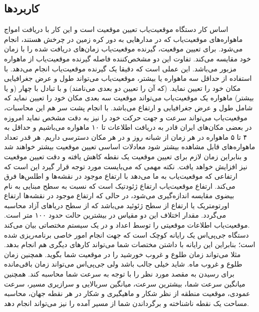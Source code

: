 \subsection{کاربردها}
اساس کار دستگاه موقعیت‌یاب تعیین موقعیت است و این کار با دریافت امواج ماهواره‌های موقعیت‌یاب که در مدارهایی به دور کره زمین در چرخش هستند، انجام می‌شود. برای تعیین موقعیت، گیرنده موقعیت‌یاب زمان‌های دریافت شده را با زمان خود مقایسه می‌کند. تفاوت این دو مشخص‌کننده فاصله گیرنده موقعیت‌یاب از ماهواره مزبور می‌باشد. این عملی است که دقیقا یک گیرنده موقعیت‌یاب انجام می‌دهد. با استفاده از حداقل سه ماهواره یا بیشتر، موقعیت‌یاب می‌تواند طول و عرض جغرافیایی مکان خود را تعیین نماید. (که آن را تعیین دو بعدی می‌نامند) و با تبادل با چهار (و یا بیشتر) ماهواره یک موقعیت‌یاب می‌تواند موقعیت سه بعدی مکان خود را تعیین نماید که شامل طول و عرض جغرافیایی و ارتفاع می‌باشد. با انجام پشت سر هم این محاسبات، موقعیت‌یاب می‌تواند سرعت و جهت حرکت خود را نیز به دقت مشخص نماید امروزه در بعضی مکان‌های ایران قادر به دریافت اطلاعات تا ۱۰ ماهواره می‌باشیم و حداقل به ۴ تا ۵ ماهواره در هر زمان از شبانه روز و در هر مکان دسترسی داریم. هر قدر تعداد ماهواره‌های قابل مشاهده بیشتر شود معادلات اساسی تعیین موقعیت بیشتر خواهند شد و بنابراین زمان لازم برای تعیین موقعیت یک نقطه کاهش یافته و دقت تعیین موقعیت نیز افزایش خواهد یافت. نکته مهمی که می‌بایست مورد توجه قرار گیرد این است که ارتفاعی که موقعیت‌یاب به ما می‌دهد با ارتفاع موجود در نقشه‌ها و اطلس‌ها فرق می‌کند. ارتفاع موقعیت‌یاب ارتفاع ژئودتیک است که نسبت به سطح مبنایی به نام بیضوی مقایسه اندازه‌گیری می‌شود، در حالی که ارتفاع موجود در نقشه‌ها ارتفاع اورتومتریک یا ارتفاع از سطح ژئوئید می‌باشد که از سطح دریاهای آزاد محاسبه می‌گردد. مقدار اختلاف این دو مقیاس در بیشترین حالت حدود ۱۰۰ متر است. موقعیت‌یاب اطلاعات موقعیتی را توسط اعداد و در یک سیستم مختصاتی بیان می‌کند. 
\\
دستگاه جی‌پی‌اس یک رایانه کوچک است که جهت انجام امور خاصی برنامه‌ریزی شده ‌است؛ بنابراین این رایانه با داشتن مختصات شما می‌تواند کارهای دیگری هم انجام بدهد. مثلا می‌تواند زمان طلوع و غروب خورشید را در موقعیت شما بگوید. همچنین زمان طلوع و غروب ماه. شاید خیلی جالب باشد ولی جی‌پی‌اس می‌تواند زمان باقی‌مانده برای رسیدن به مقصد مورد نظر را با توجه به سرعت شما محاسبه کند. همچنین میانگین سرعت شما، بیشترین سرعت، میانگین سربالایی و سرازیری مسیر، سرعت عمودی، موقعیت منطقه از نظر شکار و ماهیگیری و شکار در هر نقطه جهان، محاسبه مساحت یک نقطه ناشناخته و برگرداندن شما از مسیر آمده را نیز می‌تواند انجام دهد.


